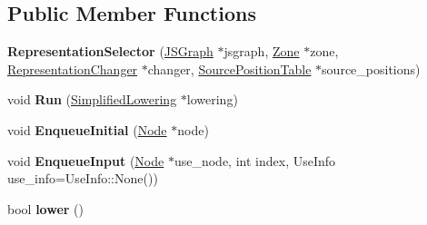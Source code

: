 \subsection*{Public Member Functions}
\begin{DoxyCompactItemize}
\item 
{\bfseries Representation\+Selector} (\hyperlink{classv8_1_1internal_1_1compiler_1_1_j_s_graph}{J\+S\+Graph} $\ast$jsgraph, \hyperlink{classv8_1_1internal_1_1_zone}{Zone} $\ast$zone, \hyperlink{classv8_1_1internal_1_1compiler_1_1_representation_changer}{Representation\+Changer} $\ast$changer, \hyperlink{classv8_1_1internal_1_1compiler_1_1_source_position_table}{Source\+Position\+Table} $\ast$source\+\_\+positions)\hypertarget{classv8_1_1internal_1_1compiler_1_1_representation_selector_ad3aa4b094423c3fdd35fb5e4393d8dd7}{}\label{classv8_1_1internal_1_1compiler_1_1_representation_selector_ad3aa4b094423c3fdd35fb5e4393d8dd7}

\item 
void {\bfseries Run} (\hyperlink{classv8_1_1internal_1_1compiler_1_1_simplified_lowering}{Simplified\+Lowering} $\ast$lowering)\hypertarget{classv8_1_1internal_1_1compiler_1_1_representation_selector_aa5fd951362b54fb920c49784e873345c}{}\label{classv8_1_1internal_1_1compiler_1_1_representation_selector_aa5fd951362b54fb920c49784e873345c}

\item 
void {\bfseries Enqueue\+Initial} (\hyperlink{classv8_1_1internal_1_1compiler_1_1_node}{Node} $\ast$node)\hypertarget{classv8_1_1internal_1_1compiler_1_1_representation_selector_a13b6ed923717c0fea01aa1ddc6cee062}{}\label{classv8_1_1internal_1_1compiler_1_1_representation_selector_a13b6ed923717c0fea01aa1ddc6cee062}

\item 
void {\bfseries Enqueue\+Input} (\hyperlink{classv8_1_1internal_1_1compiler_1_1_node}{Node} $\ast$use\+\_\+node, int index, Use\+Info use\+\_\+info=Use\+Info\+::\+None())\hypertarget{classv8_1_1internal_1_1compiler_1_1_representation_selector_aa0864b9a1c7ac1ac13d37cd493309967}{}\label{classv8_1_1internal_1_1compiler_1_1_representation_selector_aa0864b9a1c7ac1ac13d37cd493309967}

\item 
bool {\bfseries lower} ()\hypertarget{classv8_1_1internal_1_1compiler_1_1_representation_selector_a38ccb1a191ef887baed18f662423b423}{}\label{classv8_1_1internal_1_1compiler_1_1_representation_selector_a38ccb1a191ef887baed18f662423b423}


\end{DoxyCompactItemize}
